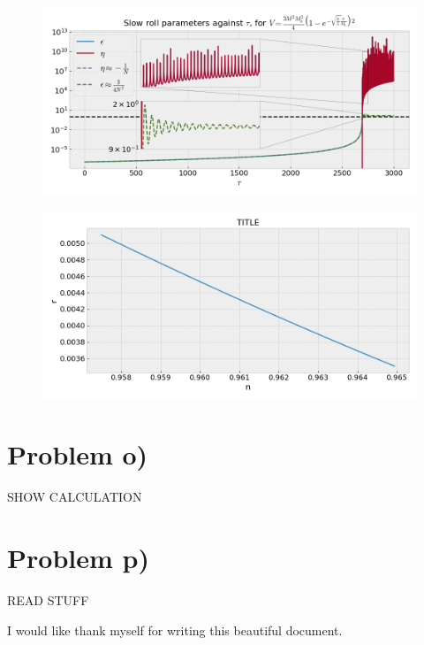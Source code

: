 \documentclass[reprint,english,notitlepage]{revtex4-1}  %
\numberwithin{equation}{section}
\begin{document}
\begin{figure}[h!]
	\includegraphics[width=\linewidth]{StarobinskyPotential_slowroll-tau.png}
	\caption{}
	\label{}
\end{figure}

\begin{figure}[h!]
	\includegraphics[width=\linewidth]{StarobinskyPotential_slowroll-nr.png}
	\caption{}
	\label{}
\end{figure}

\section{Problem o)}
SHOW CALCULATION

\section{Problem p)}
READ STUFF

\begin{acknowledgments}  %
I would like thank myself for writing this beautiful document.
\end{acknowledgments}
\end{document}

